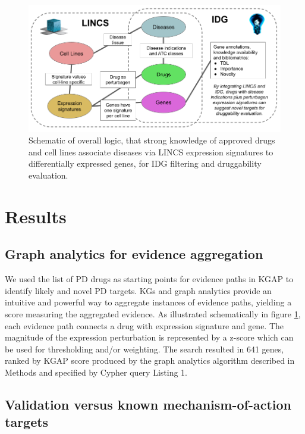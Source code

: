 \begin{figure}
	\includegraphics[width=\textwidth]{figures/kgap/KGAP_LINCS-IDG Schematic.png}
	\caption{Schematic of overall logic, that strong knowledge of approved drugs and cell lines associate diseases via LINCS expression signatures to differentially expressed genes, for IDG filtering and druggability evaluation.}
	\label{fig:KGAP_LINCS-IDG_Schematic}
\end{figure}

\section {Results}

\subsection{Graph analytics for evidence aggregation}

We used the list of PD drugs as starting points for evidence paths in KGAP to identify likely and novel PD targets. KGs and graph analytics provide an intuitive and powerful way to aggregate instances of evidence paths, yielding a score measuring the aggregated evidence. As illustrated schematically in figure \ref{fig:KGAP_LINCS-IDG_Schematic}, each evidence path connects a drug with expression signature and gene. The magnitude of the expression perturbation is represented by a z-score which can be used for thresholding and/or weighting. The search resulted in 641 genes, ranked by KGAP score produced by the graph analytics algorithm described in Methods and specified by Cypher query Listing 1.

\subsection{Validation versus known mechanism-of-action targets}


